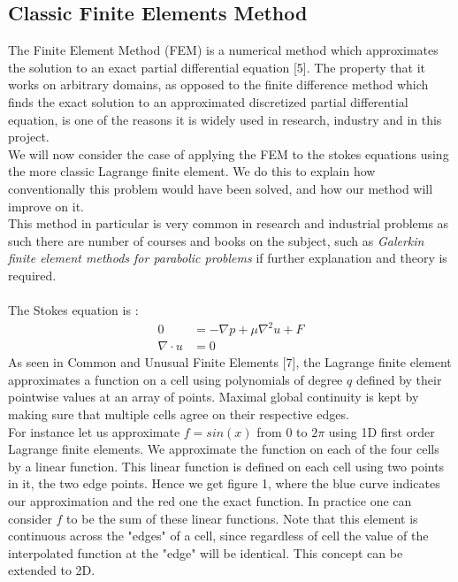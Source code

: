 \documentclass[11pt,twoside,a4paper]{article}
\begin{document}
\subsection{Classic Finite Elements Method}
The Finite Element Method (FEM) is a numerical method which approximates the solution to an exact partial differential equation [5]. The property that it works on arbitrary domains, as opposed to the finite difference method which finds the exact solution to an approximated discretized partial differential equation, is one of the reasons it is widely used in research, industry and in this project.\\
We will now consider the case of applying the FEM to the stokes equations using the more classic Lagrange finite element. We do this to explain how conventionally this problem would have been solved, and how our method will improve on it.\\
This method in particular is very common in research and industrial problems as such there are number of courses and books on the subject, such as \textit{Galerkin finite element methods for parabolic problems} if further explanation and theory is required.\\
\\
The Stokes equation is :
\begin{align}
0 &= -\nabla p + \mu \nabla^2 u + F \\
\nabla \cdot u &= 0
\end{align}
As seen in Common and Unusual Finite Elements [7], the Lagrange finite element approximates a function on a cell using polynomials of degree $q$ defined by their pointwise values at an array of points. Maximal global continuity is kept by making sure  that multiple cells agree on their respective edges.\\
For instance let us approximate $f = sin(x)$ from $0$ to $2 \pi$ using 1D first order Lagrange finite elements. We approximate the function on each of the four cells by a linear function. This linear function is defined on each cell using two points in it, the two edge points. Hence we get figure 1, where the blue curve indicates our approximation and the red one the exact function. In practice one can consider $f$ to be the sum of these linear functions. Note that this element is continuous across the "edges" of a cell, since regardless of cell the value of the interpolated function at the "edge" will be identical. This concept can be extended to 2D.\\
\end{document}
